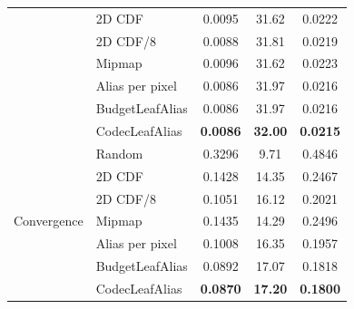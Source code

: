 \begin{table}[t]
\begin{tabular}{ll ccc}
 & 2D CDF & 0.0095 & 31.62 & 0.0222 \\
 & 2D CDF/8 & 0.0088 & 31.81 & 0.0219 \\
 & Mipmap & 0.0096 & 31.62 & 0.0223 \\
 & Alias per pixel & 0.0086 & 31.97 & 0.0216 \\
 & BudgetLeafAlias & 0.0086 & 31.97 & 0.0216 \\
 & CodecLeafAlias & \textbf{0.0086} & \textbf{32.00} & \textbf{0.0215} \\
\midrule
\multirow{7}{*}{Convergence}
 & Random & 0.3296 & 9.71 & 0.4846 \\
 & 2D CDF & 0.1428 & 14.35 & 0.2467 \\
 & 2D CDF/8 & 0.1051 & 16.12 & 0.2021 \\
 & Mipmap & 0.1435 & 14.29 & 0.2496 \\
 & Alias per pixel & 0.1008 & 16.35 & 0.1957 \\
 & BudgetLeafAlias & 0.0892 & 17.07 & 0.1818 \\
 & CodecLeafAlias & \textbf{0.0870} & \textbf{17.20} & \textbf{0.1800} \\
\bottomrule
\end{tabular}
\end{table}

